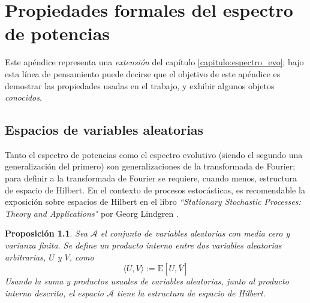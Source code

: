 \documentclass[12pt,letterpaper]{book}
\newtheorem{proposicion}[teorema]{Proposición}
\newcommand{\E}[1]{\mathrm{E}\left[ #1 \right]}
\begin{document}
\chapter{Propiedades formales del espectro de potencias}
\label{apendice:espectral}

Este apéndice representa una \textit{extensión} del capítulo \ref{capitulo:espectro_evo}; 
%
bajo esta línea de pensamiento puede decirse que el objetivo de este apéndice es demostrar las propiedades usadas en el trabajo, y exhibir algunos objetos \textit{conocidos}.

\section{Espacios de variables aleatorias}
\label{sec:espacios_aleatorios}

Tanto el espectro de potencias como el espectro evolutivo (siendo el segundo una generalización del primero) son generalizaciones de la transformada de Fourier;
%
%
para definir a la transformada de Fourier se requiere, cuando menos, estructura de espacio de Hilbert.
%
En el contexto de procesos estocásticos, es recomendable la exposición sobre espacios de Hilbert en el libro \textit{``Stationary Stochastic Processes: Theory and Applications"} por Georg Lindgren \cite{estacionariedad_lindgren}.

\begin{proposicion}
\label{teo:hilbert_random}
Sea $\mathcal{A}$ el conjunto de variables aleatorias con media cero y varianza finita. Se define un producto interno entre dos variables aleatorias arbitrarias, $U$ y $V$, como
\begin{equation}
\langle U , V \rangle := \E{U, \overline{V}}
\end{equation}
Usando la suma y productos usuales de variables aleatorias, junto al producto interno descrito, el espacio $\mathcal{A}$ tiene la estructura de espacio de Hilbert.
\end{proposicion}
\end{document}
